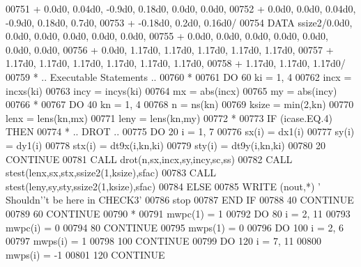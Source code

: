 \begin{DoxyCode}
00751      +                  0.0d0, 0.04d0, -0.9d0, 0.18d0, 0.0d0, 0.0d0,
00752      +                  0.0d0, 0.0d0, 0.04d0, -0.9d0, 0.18d0, 0.7d0,
00753      +                  -0.18d0, 0.2d0, 0.16d0/
00754       \textcolor{keyword}{DATA}              ssize2/0.0d0, 0.0d0, 0.0d0, 0.0d0, 0.0d0, 0.0d0,
00755      +                  0.0d0, 0.0d0, 0.0d0, 0.0d0, 0.0d0, 0.0d0, 0.0d0,
00756      +                  0.0d0, 1.17d0, 1.17d0, 1.17d0, 1.17d0, 1.17d0,
00757      +                  1.17d0, 1.17d0, 1.17d0, 1.17d0, 1.17d0, 1.17d0,
00758      +                  1.17d0, 1.17d0, 1.17d0/
00759 \textcolor{comment}{*     .. Executable Statements ..}
00760 \textcolor{comment}{*}
00761       \textcolor{keywordflow}{DO} 60 ki = 1, 4
00762          incx = incxs(ki)
00763          incy = incys(ki)
00764          mx = abs(incx)
00765          my = abs(incy)
00766 \textcolor{comment}{*}
00767          \textcolor{keywordflow}{DO} 40 kn = 1, 4
00768             n = ns(kn)
00769             ksize = min(2,kn)
00770             lenx = lens(kn,mx)
00771             leny = lens(kn,my)
00772 \textcolor{comment}{*}
00773             \textcolor{keywordflow}{IF} (icase.EQ.4) \textcolor{keywordflow}{THEN}
00774 \textcolor{comment}{*              .. DROT ..}
00775                \textcolor{keywordflow}{DO} 20 i = 1, 7
00776                   sx(i) = dx1(i)
00777                   sy(i) = dy1(i)
00778                   stx(i) = dt9x(i,kn,ki)
00779                   sty(i) = dt9y(i,kn,ki)
00780    20          \textcolor{keywordflow}{CONTINUE}
00781                \textcolor{keyword}{CALL }drot(n,sx,incx,sy,incy,sc,ss)
00782                \textcolor{keyword}{CALL }stest(lenx,sx,stx,ssize2(1,ksize),sfac)
00783                \textcolor{keyword}{CALL }stest(leny,sy,sty,ssize2(1,ksize),sfac)
00784             \textcolor{keywordflow}{ELSE}
00785                \textcolor{keyword}{WRITE} (nout,*) \textcolor{stringliteral}{' Shouldn'}\textcolor{stringliteral}{'t be here in CHECK3'}
00786                stop
00787 \textcolor{keywordflow}{            END IF}
00788    40    \textcolor{keywordflow}{CONTINUE}
00789    60 \textcolor{keywordflow}{CONTINUE}
00790 \textcolor{comment}{*}
00791       mwpc(1) = 1
00792       \textcolor{keywordflow}{DO} 80 i = 2, 11
00793          mwpc(i) = 0
00794    80 \textcolor{keywordflow}{CONTINUE}
00795       mwps(1) = 0
00796       \textcolor{keywordflow}{DO} 100 i = 2, 6
00797          mwps(i) = 1
00798   100 \textcolor{keywordflow}{CONTINUE}
00799       \textcolor{keywordflow}{DO} 120 i = 7, 11
00800          mwps(i) = -1
00801   120 \textcolor{keywordflow}{CONTINUE}

\end{DoxyCode}
